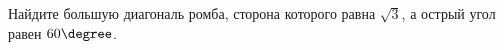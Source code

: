 \begin{ex}
	\begin{condition}
		Найдите большую диагональ ромба, сторона которого равна \( \sqrt{3} \), а острый угол равен \( 60\degree \).
	\end{condition}
\end{ex}